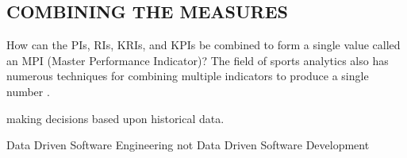 \documentclass[SDSUThesis.tex]{subfiles}
\begin{document}
    \subsection{COMBINING THE MEASURES}
    
        How can the PIs, RIs, KRIs, and KPIs be combined to form a single
        value called an MPI (Master Performance Indicator)?  The field
        of sports analytics also has numerous techniques for combining
        multiple indicators to produce a single number \cite{Cervone2014}.







making decisions based upon historical data.  

Data Driven Software Engineering not Data Driven Software Development
\end{document}
